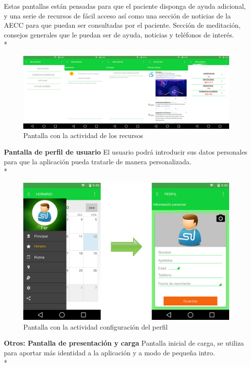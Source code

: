 \documentclass[../pfc.tex]{subfiles}
\begin{document}
		
		
		Estas pantallas están pensadas para que el paciente disponga de ayuda adicional, y una serie de recursos de fácil acceso así como una sección de noticias de la AECC para que puedan ser consultadas por el paciente.
		Sección de meditación, consejos generales que le puedan ser de ayuda, noticias y teléfonos de interés. \\*
		
		\begin{figure}[H]
			\centering
			\includegraphics[width=0.9\linewidth]{../images/recursos}
			\caption{Pantalla con la actividad de los recursos}
			\label{fig:recursos}
		\end{figure}
		
		
		\textbf{Pantalla de perfil de usuario}
		El usuario podrá introducir sus datos personales para que la aplicación pueda tratarle de manera personalizada.\\*
		
		\begin{figure}[H]
			\centering
			\includegraphics[width=0.7\linewidth]{../images/perfil_2}
			\caption{Pantalla con la actividad configuración del perfil}
			\label{fig:perfil_2}
		\end{figure}
		
		
		\textbf{Otros: Pantalla de presentación y carga}
		Pantalla inicial de carga, se utiliza para aportar más identidad a la aplicación y a modo de pequeña intro.\\*
		
\end{document}

